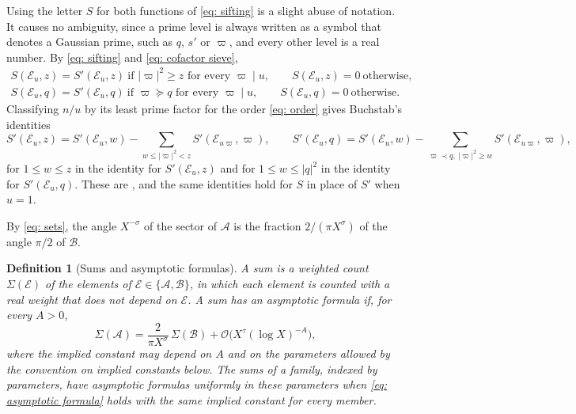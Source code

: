 \documentclass{article}
\numberwithin{equation}{section}
\newtheorem{definition}{Definition}
\newcommand{\Le}{\leqslant}
\newcommand{\Ge}{\geqslant}
\begin{document}
Using the letter $S$ for both functions of \eqref{eq: sifting} is a slight abuse of notation. It causes no ambiguity, since a prime level is always written as a symbol that denotes a Gaussian prime, such as $q$, $s'$ or $\varpi$, and every other level is a real number. By \eqref{eq: sifting} and \eqref{eq: cofactor sieve},
\begin{equation*}
\begin{gathered}
S(\mathcal{E}_u, z) = S'(\mathcal{E}_u, z) \ \text{if } |\varpi|^2 \Ge z \text{ for every } \varpi \mid u, \qquad S(\mathcal{E}_u, z) = 0 \ \text{otherwise}, \\
S(\mathcal{E}_u, q) = S'(\mathcal{E}_u, q) \ \text{if } \varpi \succcurlyeq q \text{ for every } \varpi \mid u, \qquad S(\mathcal{E}_u, q) = 0 \ \text{otherwise}.
\end{gathered}
\end{equation*}
Classifying $n/u$ by its least prime factor for the order \eqref{eq: order} gives Buchstab's identities
\begin{equation}
\label{eq: buchstab}
S'(\mathcal{E}_u, z) = S'(\mathcal{E}_u, w) - \sum_{w \Le |\varpi|^2 < z} S'(\mathcal{E}_{u\varpi}, \varpi), \qquad S'(\mathcal{E}_u, q) = S'(\mathcal{E}_u, w) - \sum_{\varpi \prec q,\ |\varpi|^2 \Ge w} S'(\mathcal{E}_{u\varpi}, \varpi),
\end{equation}
for $1 \Le w \Le z$ in the identity for $S'(\mathcal{E}_u, z)$ and for $1 \Le w \Le |q|^2$ in the identity for $S'(\mathcal{E}_u, q)$. These are \citet[(13)]{harman2001gaussian}, and the same identities hold for $S$ in place of $S'$ when $u = 1$.

By \eqref{eq: sets}, the angle $X^{-\sigma}$ of the sector of $\mathcal{A}$ is the fraction $2/(\pi X^{\sigma})$ of the angle $\pi/2$ of $\mathcal{B}$.

\begin{definition}[Sums and asymptotic formulas]
\label{def: asymptotic formula}
A \emph{sum} is a weighted count $\Sigma(\mathcal{E})$ of the elements of $\mathcal{E} \in \{\mathcal{A}, \mathcal{B}\}$, in which each element is counted with a real weight that does not depend on $\mathcal{E}$. A sum \emph{has an asymptotic formula} if, for every $A > 0$,
\begin{equation}
\label{eq: asymptotic formula}
\Sigma(\mathcal{A}) = \frac{2}{\pi X^{\sigma}}\, \Sigma(\mathcal{B}) + \mathcal{O}\bigl( X^{\tau} (\log X)^{-A} \bigr),
\end{equation}
where the implied constant may depend on $A$ and on the parameters allowed by the convention on implied constants below. The sums of a family, indexed by parameters, have asymptotic formulas \emph{uniformly} in these parameters when \eqref{eq: asymptotic formula} holds with the same implied constant for every member.
\end{definition}
\end{document}
